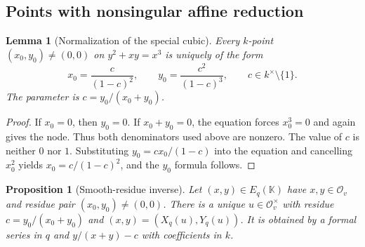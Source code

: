 \documentclass[11pt,letterpaper]{article}
\newtheorem{lemma}[lemma]{Lemma}
\newtheorem{proposition}[proposition]{Proposition}
\theoremstyle{definition}
\newcommand{\OO}{\mathcal O}
\newcommand{\KK}{\mathbb K}
\begin{document}
\subsection{Points with nonsingular affine reduction}

\begin{lemma}[Normalization of the special cubic]\label{tate:node:lem:nodalnormalization}
Every $k$-point $(x_0,y_0)\ne(0,0)$ on $y^2+xy=x^3$ is uniquely of the form
\[
 x_0=\frac{c}{(1-c)^2},\qquad
 y_0=\frac{c^2}{(1-c)^3},\qquad c\in k^\times\setminus\{1\}.
\]
The parameter is $c=y_0/(x_0+y_0)$.
\end{lemma}

\begin{proof}
If $x_0=0$, then $y_0=0$. If $x_0+y_0=0$, the equation forces $x_0^3=0$
and again gives the node. Thus both denominators used above are nonzero.
The value of $c$ is neither $0$ nor $1$. Substituting $y_0=cx_0/(1-c)$ into
the equation and cancelling $x_0^2$ yields $x_0=c/(1-c)^2$, and the $y_0$
formula follows.
\end{proof}

\begin{proposition}[Smooth-residue inverse]\label{tate:node:prop:smooth}
Let $(x,y)\in E_q(\KK)$ have $x,y\in\OO_v$ and residue pair
$(x_0,y_0)\ne(0,0)$. There is a unique $u\in\OO_v^\times$ with residue
$c=y_0/(x_0+y_0)$ and $(x,y)=(X_q(u),Y_q(u))$. It is obtained by a formal
series in $q$ and $y/(x+y)-c$ with coefficients in $k$.
\end{proposition}
\end{document}

